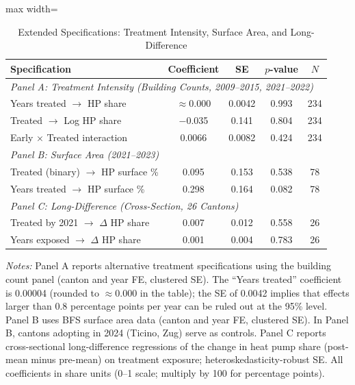 \documentclass[12pt]{article}
\begin{document}
\begin{table}[H]
\centering
\caption{Extended Specifications: Treatment Intensity, Surface Area, and Long-Difference}
\label{tab:extensions}
\begin{adjustbox}{max width=\textwidth}
\begin{tabular}{lcccc}
\toprule
Specification & Coefficient & SE & $p$-value & $N$ \\
\midrule
\multicolumn{5}{l}{\textit{Panel A: Treatment Intensity (Building Counts, 2009--2015, 2021--2022)}} \\[3pt]
Years treated $\rightarrow$ HP share & $\approx 0.000$ & 0.0042 & 0.993 & 234 \\
Treated $\rightarrow$ Log HP share & $-$0.035 & 0.141 & 0.804 & 234 \\
Early $\times$ Treated interaction & 0.0066 & 0.0082 & 0.424 & 234 \\
\midrule
\multicolumn{5}{l}{\textit{Panel B: Surface Area (2021--2023)}} \\[3pt]
Treated (binary) $\rightarrow$ HP surface \% & 0.095 & 0.153 & 0.538 & 78 \\
Years treated $\rightarrow$ HP surface \% & 0.298 & 0.164 & 0.082 & 78 \\
\midrule
\multicolumn{5}{l}{\textit{Panel C: Long-Difference (Cross-Section, 26 Cantons)}} \\[3pt]
Treated by 2021 $\rightarrow$ $\Delta$ HP share & 0.007 & 0.012 & 0.558 & 26 \\
Years exposed $\rightarrow$ $\Delta$ HP share & 0.001 & 0.004 & 0.783 & 26 \\
\bottomrule
\end{tabular}
\end{adjustbox}
\begin{minipage}{0.92\textwidth}
\vspace{6pt}
\footnotesize
\textit{Notes:} Panel A reports alternative treatment specifications using the building count panel (canton and year FE, clustered SE). The ``Years treated'' coefficient is 0.00004 (rounded to $\approx 0.000$ in the table); the SE of 0.0042 implies that effects larger than 0.8 percentage points per year can be ruled out at the 95\% level. Panel B uses BFS surface area data (canton and year FE, clustered SE). In Panel B, cantons adopting in 2024 (Ticino, Zug) serve as controls. Panel C reports cross-sectional long-difference regressions of the change in heat pump share (post-mean minus pre-mean) on treatment exposure; heteroskedasticity-robust SE. All coefficients in share units (0--1 scale; multiply by 100 for percentage points).
\end{minipage}
\end{table}
\end{document}
